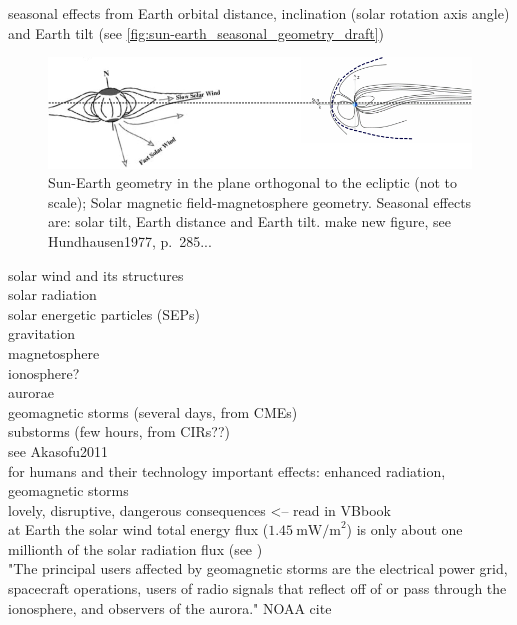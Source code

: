 seasonal effects from Earth orbital distance, inclination (solar rotation axis angle) and Earth tilt (see \autoref{fig:sun-earth_seasonal_geometry_draft})\\
\begin{figure}[htb]
	\centering
	\includegraphics[width=\textwidth]{images/own_figures/sun-earth_seasonal_geometry_draft.png}
	\caption{Sun-Earth geometry in the plane orthogonal to the ecliptic (not to scale); Solar magnetic field-magnetosphere geometry. Seasonal effects are: solar tilt, Earth distance and Earth tilt. make new figure, see Hundhausen1977, p.~285...}
	\label{fig:sun-earth_seasonal_geometry_draft}
\end{figure}

solar wind and its structures\\
solar radiation\\
solar energetic particles (SEPs)\\
gravitation\\

magnetosphere\\
ionosphere?\\
aurorae\\
geomagnetic storms (several days, from CMEs)\\
substorms (few hours, from CIRs??)\\

see Akasofu2011\\

for humans and their technology important effects: enhanced radiation, geomagnetic storms\\
lovely, disruptive, dangerous consequences <-- read in VBbook\\

at Earth the solar wind total energy flux ($1.45~\text{mW/m}^2$) is only about one millionth of the solar radiation flux (see \citet[p.~153]{Schwenn1990})\\

"The principal users affected by geomagnetic storms are the electrical power grid, spacecraft operations, users of radio signals that reflect off of or pass through the ionosphere, and observers of the aurora." NOAA cite\\


